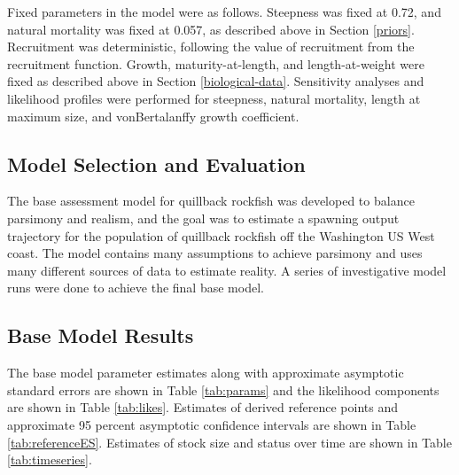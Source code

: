 \documentclass[11pt,
  english,
  a4paper,
]{article}
\begin{document}
\leavevmode\tagmcend\tagstructend\par


Fixed parameters in the model were as follows. Steepness was fixed at 0.72, and natural mortality was fixed at 0.057, as described above in Section \ref{priors}. Recruitment was deterministic, following the value of recruitment from the recruitment function. Growth, maturity-at-length, and length-at-weight were fixed as described above in Section \ref{biological-data}. Sensitivity analyses and likelihood profiles were performed for steepness, natural mortality, length at maximum size, and vonBertalanffy growth coefficient.

\leavevmode\tagmcend\tagstructend\par


\hypertarget{model-selection-and-evaluation}{%
\subsection{Model Selection and Evaluation}\label{model-selection-and-evaluation}}

\leavevmode\tagmcend\tagstructend


The base assessment model for quillback rockfish was developed to balance parsimony and realism, and the goal was to estimate a spawning output trajectory for the population of quillback rockfish off the Washington US West coast. The model contains many assumptions to achieve parsimony and uses many different sources of data to estimate reality. A series of investigative model runs were done to achieve the final base model.

\leavevmode\tagmcend\tagstructend\par


\hypertarget{base-model-results}{%
\subsection{Base Model Results}\label{base-model-results}}

\leavevmode\tagmcend\tagstructend


The base model parameter estimates along with approximate asymptotic standard errors are shown in Table \ref{tab:params} and the likelihood components are shown in Table \ref{tab:likes}. Estimates of derived reference points and approximate 95 percent asymptotic confidence intervals are shown in Table \ref{tab:referenceES}. Estimates of stock size and status over time are shown in Table \ref{tab:timeseries}.
\end{document}
